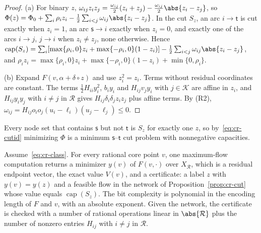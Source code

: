 \begin{proof}
(a) For binary $z$,
$\omega_{ij}z_iz_j=\frac{\omega_{ij}}2(z_i+z_j)-\frac{\omega_{ij}}2\abs{z_i-z_j}$,
so $\Phi(z)=\Phi_0+\sum_i\rho_iz_i-\frac12\sum_{i<j}\omega_{ij}\abs{z_i-z_j}$. In the
cut $S_z$, an arc $i\to\mathsf t$ is cut exactly when $z_i=1$, an arc
$\mathsf s\to i$ exactly when $z_i=0$, and exactly one of the arcs
$i\to j$, $j\to i$ when $z_i\ne z_j$, none otherwise. Hence
$\operatorname{cap}(S_z)=\sum_i[\max\{\rho_i,0\}z_i+\max\{-\rho_i,0\}(1-z_i)]
-\frac12\sum_{i<j}\omega_{ij}\abs{z_i-z_j}$, and
$\rho_iz_i=\max\{\rho_i,0\}z_i+\max\{-\rho_i,0\}(1-z_i)+\min\{0,\rho_i\}$.

(b) Expand $F(v,\alpha+\delta\circ z)$ and use $z_i^2=z_i$. Terms without
residual coordinates are constant. The terms $\frac12H_{ii}y_i^2$, $b_iy_i$
and $H_{ij}v_jy_i$ with $j\in\mathcal K$ are affine in $z_i$, and
$H_{ij}y_iy_j$ with $i\ne j$ in $\mathcal R$ gives
$H_{ij}\delta_i\delta_jz_iz_j$ plus affine terms. By (R2),
$\omega_{ij}=H_{ij}o_io_j(u_i-\ell_i)(u_j-\ell_j)\le0$.
\end{proof}

Every node set that contains $\mathsf s$ but not $\mathsf t$ is $S_z$ for
exactly one $z$, so by~\eqref{eq:cr-cutid} minimizing $\Phi$ is a minimum
$\mathsf s$--$\mathsf t$ cut problem with nonnegative capacities.

\begin{theorem}\label{thm:cr-oracle}
Assume~\eqref{eq:cr-class}. For every rational core point $v$, one
maximum-flow computation returns a minimizer $y(v)$ of $F(v,\cdot)$ over
$X_{\mathcal R}$, which is a residual endpoint vector, the exact value
$V(v)$, and a certificate: a label $z$ with $y(v)=y(z)$ and a feasible flow
in the network of Proposition~\ref{prop:cr-cut} whose value equals
$\operatorname{cap}(S_z)$. The bit complexity is polynomial in the encoding
length of $F$ and $v$, with an absolute exponent. Given the network, the
certificate is checked with a number of rational operations linear in
$\abs{\mathcal R}$ plus the number of nonzero entries $H_{ij}$ with
$i\ne j$ in $\mathcal R$.
\end{theorem}

